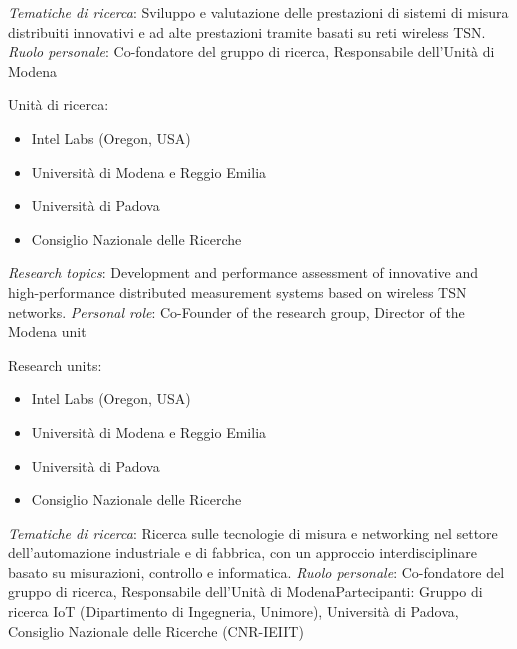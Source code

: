 



{}{\newline \emph{Tematiche di ricerca}: Sviluppo e valutazione delle prestazioni di sistemi di misura distribuiti innovativi e ad alte prestazioni tramite basati su reti wireless TSN.}
{\newline \emph{Ruolo personale}: Co-fondatore del gruppo di ricerca, Responsabile dell'Unità di Modena}{ Unità di ricerca:
	\begin{itemize}
		\item Intel Labs (Oregon, USA)
		\item Università di Modena e Reggio Emilia
		\item Università di Padova
		\item Consiglio Nazionale delle Ricerche
	\end{itemize}
	}

	{}{\newline \emph{Research topics}: Development and performance assessment of innovative and high-performance distributed measurement systems based on wireless TSN networks.}
	{\newline \emph{Personal role}: Co-Founder of the research group, Director of the Modena unit} { Research units:
	\begin{itemize}
		\item Intel Labs (Oregon, USA)
		\item Università di Modena e Reggio Emilia
		\item Università di Padova
		\item Consiglio Nazionale delle Ricerche
	\end{itemize}
	}

	{}{\newline \emph{Tematiche di ricerca}: Ricerca sulle tecnologie di misura e networking nel settore dell'automazione industriale e di fabbrica, con un approccio interdisciplinare basato su misurazioni, controllo e informatica.}
	{\newline \emph{Ruolo personale}: Co-fondatore del gruppo di ricerca, Responsabile dell'Unità di Modena}{Partecipanti: Gruppo di ricerca IoT (Dipartimento di Ingegneria, Unimore), Università di Padova, Consiglio Nazionale delle Ricerche (CNR-IEIIT)}
	{}%

